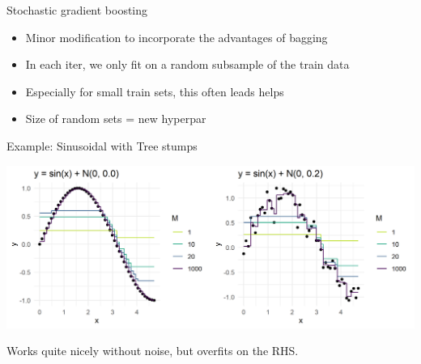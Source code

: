 \begin{vbframe}{Stochastic gradient boosting}

\begin{itemize}
\item Minor modification to incorporate the advantages of bagging
\item In each iter, we only fit on a random subsample of the train data
\item Especially for small train sets, this often leads helps
\item Size of random sets = new hyperpar

\end{itemize}

\end{vbframe}


\begin{vbframe}{Example: Sinusoidal with Tree stumps}



\begin{center}
  \includegraphics[width=\textwidth]{figure/gbm_sine.png}
\end{center}


Works quite nicely without noise, but overfits on the RHS.


\end{vbframe}

